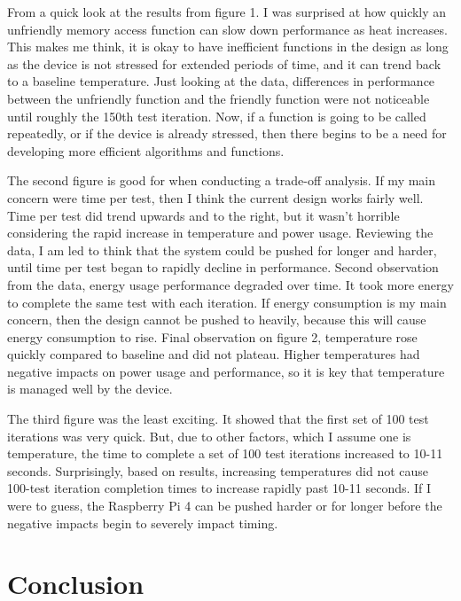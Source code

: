 \documentclass[journal]{IEEEtran}
\begin{document}
    From a quick look at the results from figure 1. I was surprised at how quickly an unfriendly memory access function can slow down performance as heat increases. 
    This makes me think, it is okay to have inefficient functions in the design as long as the device is not stressed for extended periods of time, and it can trend back to a baseline temperature.
    Just looking at the data, differences in performance between the unfriendly function and the friendly function were not noticeable until roughly the 150th test iteration.
    Now, if a function is going to be called repeatedly, or if the device is already stressed, then there begins to be a need for developing more efficient algorithms and functions.

    The second figure is good for when conducting a trade-off analysis. If my main concern were time per test, then I think the current design works fairly well. 
    Time per test did trend upwards and to the right, but it wasn't horrible considering the rapid increase in temperature and power usage.
    Reviewing the data, I am led to think that the system could be pushed for longer and harder, until time per test began to rapidly decline in performance.
    Second observation from the data, energy usage performance degraded over time. It took more energy to complete the same test with each iteration.
    If energy consumption is my main concern, then the design cannot be pushed to heavily, because this will cause energy consumption to rise.
    Final observation on figure 2, temperature rose quickly compared to baseline and did not plateau. 
    Higher temperatures had negative impacts on power usage and performance, so it is key that temperature is managed well by the device.

    The third figure was the least exciting. It showed that the first set of 100 test iterations was very quick. 
    But, due to other factors, which I assume one is temperature, the time to complete a set of 100 test iterations increased to 10-11 seconds.
    Surprisingly, based on results, increasing temperatures did not cause 100-test iteration completion times to increase rapidly past 10-11 seconds.
    If I were to guess, the Raspberry Pi 4 can be pushed harder or for longer before the negative impacts begin to severely impact timing. 

    \section{Conclusion}
\end{document}
